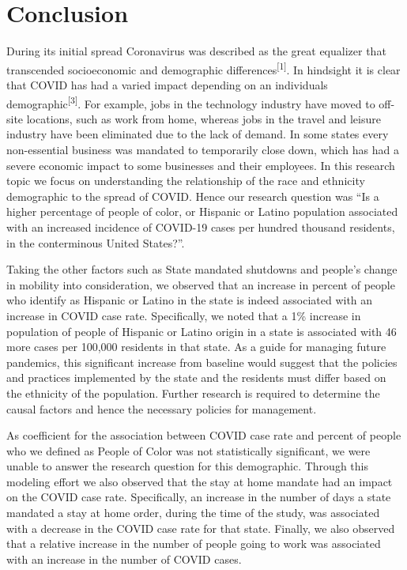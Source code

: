 \documentclass[
]{article}
\begin{document}
\hypertarget{conclusion}{%
\section{Conclusion}\label{conclusion}}

During its initial spread Coronavirus was described as the great
equalizer that transcended socioeconomic and demographic
differences\textsuperscript{{[}1{]}}. In hindsight it is clear that
COVID has had a varied impact depending on an individuals
demographic\textsuperscript{{[}3{]}}. For example, jobs in the
technology industry have moved to off-site locations, such as work from
home, whereas jobs in the travel and leisure industry have been
eliminated due to the lack of demand. In some states every non-essential
business was mandated to temporarily close down, which has had a severe
economic impact to some businesses and their employees. In this research
topic we focus on understanding the relationship of the race and
ethnicity demographic to the spread of COVID. Hence our research
question was ``Is a higher percentage of people of color, or Hispanic or
Latino population associated with an increased incidence of COVID-19
cases per hundred thousand residents, in the conterminous United
States?''.

Taking the other factors such as State mandated shutdowns and people's
change in mobility into consideration, we observed that an increase in
percent of people who identify as Hispanic or Latino in the state is
indeed associated with an increase in COVID case rate. Specifically, we
noted that a 1\% increase in population of people of Hispanic or Latino
origin in a state is associated with 46 more cases per 100,000 residents
in that state. As a guide for managing future pandemics, this
significant increase from baseline would suggest that the policies and
practices implemented by the state and the residents must differ based
on the ethnicity of the population. Further research is required to
determine the causal factors and hence the necessary policies for
management.

As coefficient for the association between COVID case rate and percent
of people who we defined as People of Color was not statistically
significant, we were unable to answer the research question for this
demographic. Through this modeling effort we also observed that the stay
at home mandate had an impact on the COVID case rate. Specifically, an
increase in the number of days a state mandated a stay at home order,
during the time of the study, was associated with a decrease in the
COVID case rate for that state. Finally, we also observed that a
relative increase in the number of people going to work was associated
with an increase in the number of COVID cases.
\end{document}
